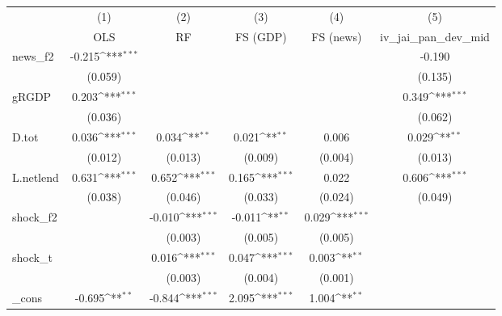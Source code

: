 {
\def\sym#1{\ifmmode^{#1}\else\(^{#1}\)\fi}
\begin{tabular}{l*{5}{c}}
\toprule
            &\multicolumn{1}{c}{(1)}&\multicolumn{1}{c}{(2)}&\multicolumn{1}{c}{(3)}&\multicolumn{1}{c}{(4)}&\multicolumn{1}{c}{(5)}\\
            &\multicolumn{1}{c}{OLS}&\multicolumn{1}{c}{RF}&\multicolumn{1}{c}{FS (GDP)}&\multicolumn{1}{c}{FS (news)}&\multicolumn{1}{c}{iv\_jai\_pan\_dev\_mid}\\
\midrule
news\_f2     &      -0.215\sym{***}&                     &                     &                     &      -0.190         \\
            &     (0.059)         &                     &                     &                     &     (0.135)         \\
\addlinespace
gRGDP       &       0.203\sym{***}&                     &                     &                     &       0.349\sym{***}\\
            &     (0.036)         &                     &                     &                     &     (0.062)         \\
\addlinespace
D.tot       &       0.036\sym{***}&       0.034\sym{**} &       0.021\sym{**} &       0.006         &       0.029\sym{**} \\
            &     (0.012)         &     (0.013)         &     (0.009)         &     (0.004)         &     (0.013)         \\
\addlinespace
L.netlend   &       0.631\sym{***}&       0.652\sym{***}&       0.165\sym{***}&       0.022         &       0.606\sym{***}\\
            &     (0.038)         &     (0.046)         &     (0.033)         &     (0.024)         &     (0.049)         \\
\addlinespace
shock\_f2    &                     &      -0.010\sym{***}&      -0.011\sym{**} &       0.029\sym{***}&                     \\
            &                     &     (0.003)         &     (0.005)         &     (0.005)         &                     \\
\addlinespace
shock\_t     &                     &       0.016\sym{***}&       0.047\sym{***}&       0.003\sym{**} &                     \\
            &                     &     (0.003)         &     (0.004)         &     (0.001)         &                     \\
\addlinespace
\_cons      &      -0.695\sym{**} &      -0.844\sym{***}&       2.095\sym{***}&       1.004\sym{**} &                     \\

\end{tabular}}
